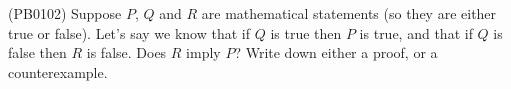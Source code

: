 (PB0102) Suppose $P$, $Q$ and $R$ are mathematical statements (so they are either true or false). Let's say we know that if $Q$ is true then $P$ is true, and that if $Q$ is false then $R$ is false. Does $R$ imply $P$? Write down either a proof, or a counterexample.
